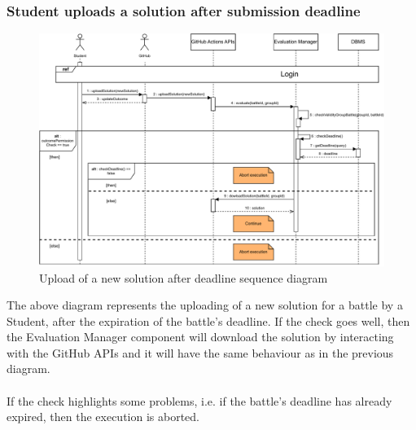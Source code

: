 \documentclass{article}
\begin{document}
{    \subsubsection{Student uploads a solution after submission deadline}
        \begin{figure}[H]
            \centering
            \hspace*{-2.4cm}\includegraphics[scale=0.8]{Sequence/Sequence12DD.pdf}
            \caption{Upload of a new solution after deadline sequence diagram}
            \label{fig:Sequence12DD}
        \end{figure}

        The above diagram represents the uploading of a new solution
        for a battle by a Student, after the expiration of the battle's deadline.
        If the check goes well, then the Evaluation Manager component will download the solution
        by interacting with the GitHub APIs and it will have the same behaviour as in the
        previous diagram.
        \\ \\
        If the check highlights some problems, i.e. if the battle's deadline has already expired,
        then the execution is aborted.

}
\end{document}
